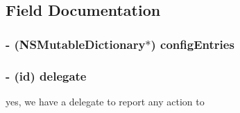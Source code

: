 \subsection{Field Documentation}
\hypertarget{interface_sword_module_aac92b28c82e8e90e1f41471b3f3d65dc}{
\subsubsection[{config\-Entries}]{\setlength{\rightskip}{0pt plus 5cm}-\/ (N\-S\-Mutable\-Dictionary$\ast$) config\-Entries\hspace{0.3cm}{\ttfamily [protected]}}}\label{interface_sword_module_aac92b28c82e8e90e1f41471b3f3d65dc}
\hypertarget{interface_sword_module_a8d9332fcd23523b1e2520b8765577423}{
\subsubsection[{delegate}]{\setlength{\rightskip}{0pt plus 5cm}-\/ (id) delegate\hspace{0.3cm}{\ttfamily [protected]}}}\label{interface_sword_module_a8d9332fcd23523b1e2520b8765577423}
yes, we have a delegate to report any action to 

